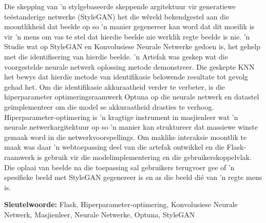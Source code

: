 \documentclass[a4paper,oneside,12pt]{book}
\begin{document}
\begin{Opsomming}{}


Die skepping van 'n stylgebaseerde skeppende argitektuur vir generatiewe teëstanderige netwerke (StyleGAN) het die wêreld bekendgestel aan die moontlikheid dat beelde op so 'n manier gegenereer kan word dat dit moeilik is vir 'n mens om vas te stel dat hierdie beelde nie werklik regte beelde is nie. 'n Studie wat op StyleGAN en 
Konvolusiese Neurale Netwerke gedoen is, het gehelp met die identifisering van hierdie beelde.  'n Artefak was geskep wat die voorgestelde neurale netwerk oplossing metode demonstreer. Die geskepte KNN het bewys dat hierdie metode van identifikasie belowende resultate tot gevolg gehad het. Om die identifikasie akkuraatheid verder te verbeter, is die hiperparameter optimeringsraamwerk Optuna op die neurale netwerk en datastel geïmplementeer om die model se akkuraatheid drasties te verhoog. Hiperparameter-optimering is 'n kragtige instrument in masjienleer wat 'n neurale netwerkargitektuur op so 'n manier kan struktureer dat massiewe winste gemaak word in die netwerkvoorspellings. Om maklike interaksie moontlik te maak was daar 'n webtoepassing deel van die artefak ontwikkel en die Flask-raamwerk is gebruik vir die modelimplementering en die gebruikerskoppelvlak. Die oplaai van beelde na die toepassing sal gebruikers terugvoer gee of 'n spesifieke beeld met StyleGAN gegenereer is en as die beeld dié van 'n regte mens is.

\textbf{Sleutelwoorde:}  Flask, Hiperparameter-optimering, Konvolusiese Neurale Netwerk, Masjienleer, Neurale Netwerke, Optuna, StyleGAN

\end{Opsomming}


\MakeTOCandLOFandLOT %
\end{document}
